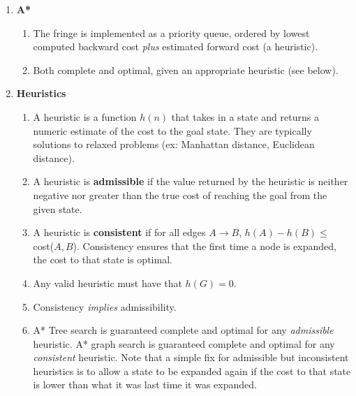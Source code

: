 \documentclass[10pt]{article}
\begin{document}
\begin{multicols}{2}
\begin{enumerate}
\begin{enumerate}
         \item \textbf{A*}
         \begin{enumerate}
             \item The fringe is implemented as a priority queue, ordered by lowest computed backward cost \textit{plus} estimated forward cost (a heuristic).
             \item Both complete and optimal, given an appropriate heuristic (see below).
         \end{enumerate}
         
         \item \textbf{Heuristics}
         \begin{enumerate}
             \item A heuristic is a function $h(n)$ that takes in a state and returns a numeric estimate of the cost to the goal state. They are typically solutions to relaxed problems (ex: Manhattan distance, Euclidean distance).
             \item A heuristic is \textbf{admissible} if the value returned by the heuristic is neither negative nor greater than the true cost of reaching the goal from the given state.
             \item A heuristic is \textbf{consistent} if for all edges $A \rightarrow B$, $h(A) - h(B) \leq$ cost($A,B$). Consistency ensures that the first time a node is expanded, the cost to that state is optimal. 
             \item Any valid heuristic must have that $h(G)=0$.
             \item Consistency \textit{implies} admissibility.
             \item A* Tree search is guaranteed complete and optimal for any \textit{admissible} heuristic. A* graph search is guaranteed complete and optimal for any \textit{consistent} heuristic. Note that a simple fix for admissible but inconsistent heuristics is to allow a state to be expanded again if the cost to that state is lower than what it was last time it was expanded.

         \end{enumerate}
    \end{enumerate}
    

\end{enumerate}
\end{multicols}
\end{document}
